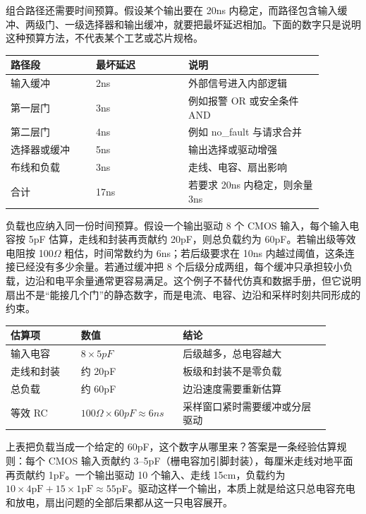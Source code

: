 组合路径还需要时间预算。假设某个输出要在 20ns 内稳定，而路径包含输入缓冲、两级门、一级选择器和输出缓冲，就要把最坏延迟相加。下面的数字只是说明这种预算方法，不代表某个工艺或芯片规格。

\begin{longtable}{L{0.24\linewidth}L{0.26\linewidth}L{0.38\linewidth}}
\toprule
路径段 & 最坏延迟 & 说明 \\
\midrule
输入缓冲 & 2ns & 外部信号进入内部逻辑 \\\tablerowrule
第一层门 & 3ns & 例如报警 OR 或安全条件 AND \\\tablerowrule
第二层门 & 4ns & 例如 no\_fault 与请求合并 \\\tablerowrule
选择器或缓冲 & 5ns & 输出选择或驱动增强 \\\tablerowrule
布线和负载 & 3ns & 走线、电容、扇出影响 \\\tablerowrule
合计 & 17ns & 若要求 20ns 内稳定，则余量 3ns \\
\bottomrule
\end{longtable}

负载也应纳入同一份时间预算。假设一个输出驱动 8 个 CMOS 输入，每个输入电容按 5pF 估算，走线和封装再贡献约 20pF，则总负载约为 60pF。若输出级等效电阻按 100$\Omega$ 粗估，时间常数约为 6ns；若后级要求在 10ns 内越过阈值，这条连接已经没有多少余量。若通过缓冲把 8 个后级分成两组，每个缓冲只承担较小负载，边沿和电平余量通常更容易满足。这个例子不替代仿真和数据手册，但它说明扇出不是“能接几个门”的静态数字，而是电流、电容、边沿和采样时刻共同形成的约束。

\begin{longtable}{L{0.2\linewidth}L{0.28\linewidth}L{0.42\linewidth}}
\toprule
估算项 & 数值 & 结论 \\
\midrule
输入电容 & $8 \times 5pF$ & 后级越多，总电容越大 \\\tablerowrule
走线和封装 & 约 20pF & 板级和封装不是零负载 \\\tablerowrule
总负载 & 约 60pF & 边沿速度需要重新估算 \\\tablerowrule
等效 RC & $100\Omega \times 60pF \approx 6ns$ & 采样窗口紧时需要缓冲或分层驱动 \\
\bottomrule
\end{longtable}

上表把负载当成一个给定的 60pF，这个数字从哪里来？答案是一条经验估算规则：每个 CMOS 输入贡献约 3–5pF（栅电容加引脚封装），每厘米走线对地平面再贡献约 1pF。一个输出驱动 10 个输入、走线 15cm，负载约为 $10\times4\mathrm{pF}+15\times1\mathrm{pF}\approx55$pF。驱动这样一个输出，本质上就是给这只总电容充电和放电，扇出问题的全部后果都从这一只电容展开。

